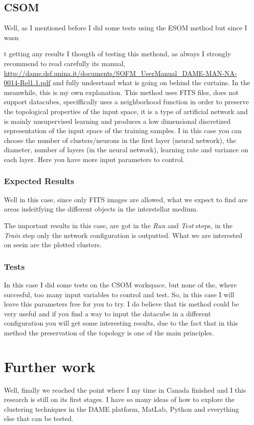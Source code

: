 \documentclass[11pt,fleqn]{book} %
\begin{document}
\subsection{CSOM}
Well, as I mentioned before I did some tests using the ESOM method but since I wasn{t getting any results I thougth of testing this methond, as always I strongly recommend to read carefully its manual, \url{http://dame.dsf.unina.it/documents/SOFM_UserManual_DAME-MAN-NA-0014-Rel1.1.pdf} and fully undesrtand what is going on behind the curtains. In the meanwhile, this is my own explanation. This method uses FITS files, does not support datacubes, speciffically uses a neighborhood function in order to preserve the topological properties of the input space, it is a type of artificial network and is mainly unsupervised learning  and produces a low dimensional discretized representation of the input space of the training samples. I in this case you can choose the number of clusters/neurons in the first layer (neural network), the diameter, number of layers (in the neural network), learning rate and variance  on each layer. Here you have more input parameters to control.
\subsubsection{Expected Results}
Well in this case, since only FITS images are allowed, what we expect to find are areas indeitfying the different objects in the interstellar medium.

The important results in this case, are got in the \emph{Run} and \emph{Test} steps, in the \emph{Train} step only the network configuration is outputted. What we are interested on seein are the plotted clusters.
\subsubsection{Tests}
In this case I did some tests on the CSOM workspace, but none of the, where succesful, too many input variables to control and test. So, in this case I will leave this parameters free for you to try. I do believe that tis method could be very useful and if you find a way to input the datacube in a different configuration you will get some interesting results, due to the fact that in this method the preservation of the topology is one of the main principles.


\section{Further work}
Well, finally we reached the point where I my time in Canada finished and I this research is still on its first stages. I have so many ideas of how to explore the clustering techniques in the DAME platform, MatLab, Python and everything else that can be tested. 

}
\end{document}

